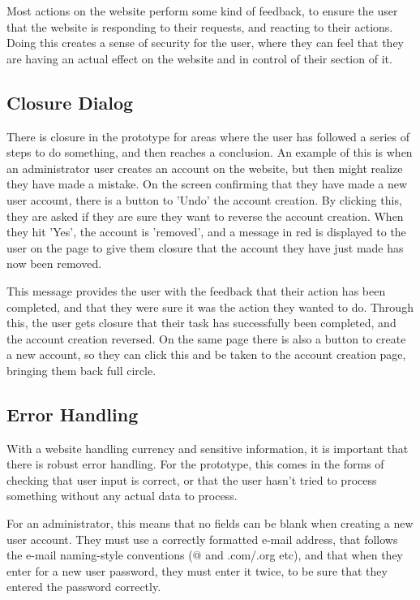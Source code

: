 \documentclass{article}
\begin{document}
Most actions on the website perform some kind of feedback, to ensure the user that the website is responding to their requests, and reacting to their actions. Doing this creates a sense of security for the user, where they can feel that they are having an actual effect on the website and in control of their section of it.

\subsection{Closure Dialog}
There is closure in the prototype for areas where the user has followed a series of steps to do something, and then reaches a conclusion. An example of this is when an administrator user creates an account on the website, but then might realize they have made a mistake. On the screen confirming that they have made a new user account, there is a button to 'Undo' the account creation. By clicking this, they are asked if they are sure they want to reverse the account creation. When they hit 'Yes', the account is 'removed', and a message in red is displayed to the user on the page to give them closure that the account they have just made has now been removed.

This message provides the user with the feedback that their action has been completed, and that they were sure it was the action they wanted to do. Through this, the user gets closure that their task has successfully been completed, and the account creation reversed. On the same page there is also a button to create a new account, so they can click this and be taken to the account creation page, bringing them back full circle.

\subsection{Error Handling}
With a website handling currency and sensitive information, it is important that there is robust error handling. For the prototype, this comes in the forms of checking that user input is correct, or that the user hasn't tried to process something without any actual data to process.

For an administrator, this means that no fields can be blank when creating a new user account. They must use a correctly formatted e-mail address, that follows the e-mail naming-style conventions (@ and  .com/.org etc), and that when they enter for a new user password, they must enter it twice, to be sure that they entered the password correctly.
\end{document}
